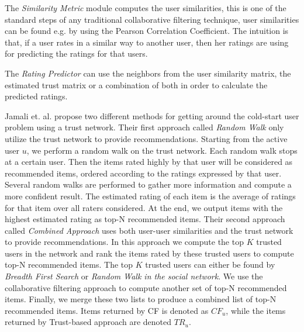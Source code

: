 The \emph{Similarity Metric} module computes the user similarities, this is one
of the standard steps of any traditional collaborative filtering technique,
user similarities can be found e.g. by using the Pearson Correlation
Coefficient. The intuition is that, if a user rates in a similar way to another
user, then her ratings are using for predicting the ratings for that users.

The \emph{Rating Predictor} can use the neighbors from the user similarity
matrix, the estimated trust matrix or a combination of both in order to
calculate the predicted ratings.



Jamali et. al. \cite{Jamali2009} propose two different methods for getting
around the cold-start user problem using a trust network. Their first approach called \emph{Random Walk} only utilize the trust network to provide recommendations. Starting from the active user $u$, we perform a random walk on the trust network. Each random walk stops at a certain user. Then the items rated highly by that user
will be considered as recommended items, ordered according to the ratings
expressed by that user. Several random walks are performed to gather more
information and compute a more confident result. The estimated rating of each
item is the average of ratings for that item over all raters considered. At the
end, we output items with the highest estimated rating as top-N recommended
items. Their second approach called \emph{Combined Approach} uses both user-user similarities and the trust network to provide recommendations. In this approach we compute the top $K$ trusted users in the network and rank
the items rated by these trusted users to compute top-N recommended items. The top $K$ trusted users can either be found by
\emph{Breadth First Search} or \emph{Random Walk in the social network}. We use the collaborative filtering approach to compute another set of top-N recommended items. Finally, we merge these two lists to produce a combined list of top-N recommended items. Items returned by CF is denoted as $CF_{u}$, while the items returned by Trust-based approach are denoted $TR_{u}$.




